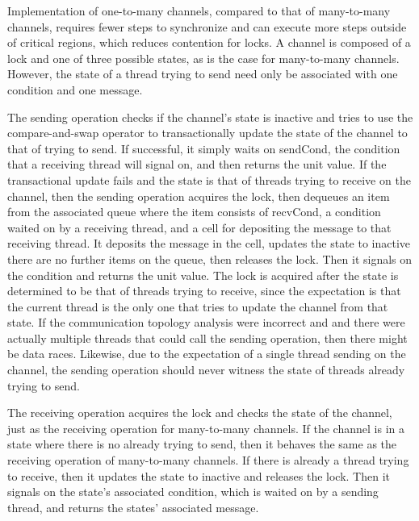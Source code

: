 \documentclass{article}
\begin{document}
Implementation of one-to-many channels, compared to that of many-to-many channels,
requires fewer
steps to synchronize and can execute more steps outside of critical regions, which reduces
contention for locks.  A channel is composed of a lock and one of three possible states, as is
the case for many-to-many channels.  However, the state of a thread trying to send need only be
associated with one condition and one message.  

The sending operation checks if the channel's state is inactive and tries to use the
compare-and-swap operator to transactionally update the state of
the channel to that of trying to
send.  If successful, it simply waits on sendCond, the condition that a receiving thread will
signal on, and then returns the unit value.  If the transactional update fails and the state is
that of threads trying to receive on the channel, then the sending operation acquires the lock,
then dequeues an item from the associated queue where the item consists of recvCond, a
condition waited on by a receiving thread, and a cell for depositing the message to that
receiving thread.  It deposits the message in the cell, updates the state to inactive there are
no further items on the queue, then releases the lock.  Then it signals on the condition and
returns the unit value. The lock is acquired after the state is determined to be that of
threads trying to receive, since the expectation is that the current thread is the only one
that tries to update the channel from that state.  If the communication topology analysis were
incorrect and and there were actually multiple threads that could call the sending operation,
then there might be data races.  Likewise, due to the expectation of a single thread
sending on the
channel, the sending operation should never witness the state of
threads already trying to send.

The receiving operation acquires the lock and checks
the state of the channel, just as the receiving
operation for many-to-many channels.  If the channel is in a state where there is no already
trying to send, then it behaves the same as the receiving operation of many-to-many channels.
If there is already a thread trying to receive, then it updates the state to inactive and
releases
the lock.  Then it signals on the state's associated condition, which is waited on by a sending
thread, and returns the states' associated message.
\end{document}
